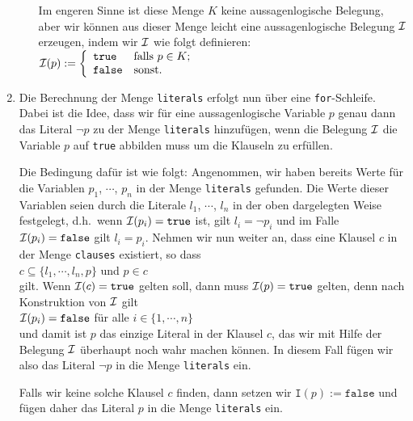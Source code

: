 \begin{enumerate}
\begin{enumerate}
            Im engeren Sinne ist diese Menge $K$
            keine aussagenlogische Belegung, aber wir k\"{o}nnen aus dieser Menge leicht eine
            aussagenlogische Belegung $\mathcal{I}$ erzeugen, indem wir $\mathcal{I}$ wie folgt definieren:
            \\[0.2cm]
            \hspace*{1.3cm}
            $\mathcal{I}(p) := \left\{
            \begin{array}{ll}
              \mathtt{true} & \mbox{falls $p \in K$;}  \\
              \mathtt{false} & \mbox{sonst.}
            \end{array}
            \right.
            $
      \end{enumerate}
\item Die Berechnung der Menge \texttt{literals} erfolgt nun \"{u}ber eine \texttt{for}-Schleife.
      Dabei ist die Idee, dass wir f\"{u}r eine aussagenlogische Variable $p$ genau dann das Literal
      $\neg p$ zu der Menge \texttt{literals} hinzuf\"{u}gen, wenn die Belegung $\mathcal{I}$ die Variable $p$
      auf \texttt{true} abbilden muss um die Klauseln zu erf\"{u}llen.  

      Die Bedingung daf\"{u}r ist wie folgt: Angenommen, wir haben bereits Werte f\"{u}r die Variablen
      $p_1$, $\cdots$, $p_n$ in der Menge \texttt{literals}  gefunden.
      Die Werte dieser Variablen seien durch die Literale $l_1$, $\cdots$, $l_n$ in der oben
      dargelegten Weise festgelegt, d.h.~wenn $\mathcal{I}(p_i) = \mathtt{true}$ ist, gilt $l_i = \neg p_i$
      und im Falle $\mathcal{I}(p_i) = \mathtt{false}$ gilt $l_i = p_i$.
      Nehmen wir nun weiter an, dass eine Klausel $c$ in der Menge \texttt{clauses} existiert, so dass
      \\[0.2cm]
      \hspace*{1.3cm}
      $c \subseteq \{ l_1, \cdots, l_n, p \}$ \quad und \quad $p \in c$
      \\[0.2cm]
      gilt.  Wenn $\mathcal{I}(c) = \mathtt{true}$ gelten soll, dann muss $\mathcal{I}(p) = \mathtt{true}$ gelten, denn
      nach Konstruktion von $\mathcal{I}$ gilt 
      \\[0.2cm]
      \hspace*{1.3cm}
      $\mathcal{I}(p_i) = \mathtt{false}$ \quad f\"{u}r alle $i \in \{1,\cdots,n\}$
      \\[0.2cm]
      und damit ist $p$ das einzige Literal in der Klausel $c$, das wir mit Hilfe der Belegung $\mathcal{I}$ \"{u}berhaupt noch wahr machen
      k\"{o}nnen.  In diesem Fall f\"{u}gen wir also das Literal $\neg p$ in die Menge \texttt{literals} ein.

      Falls wir keine solche Klausel $c$ finden, dann setzen wir $\mathtt{I}(p) := \mathtt{false}$
      und f\"{u}gen daher das Literal $p$ in die Menge \texttt{literals} ein.
\end{enumerate}
